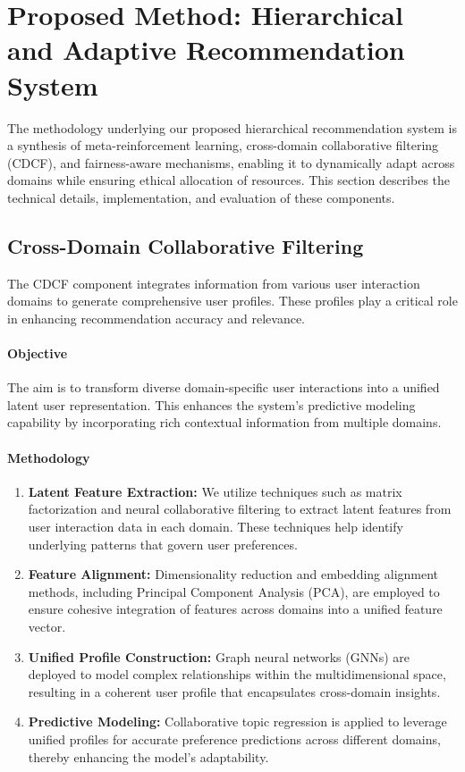 \section{Proposed Method: Hierarchical and Adaptive Recommendation System}

The methodology underlying our proposed hierarchical recommendation system is a synthesis of meta-reinforcement learning, cross-domain collaborative filtering (CDCF), and fairness-aware mechanisms, enabling it to dynamically adapt across domains while ensuring ethical allocation of resources. This section describes the technical details, implementation, and evaluation of these components.

\subsection{Cross-Domain Collaborative Filtering}

The CDCF component integrates information from various user interaction domains to generate comprehensive user profiles. These profiles play a critical role in enhancing recommendation accuracy and relevance.

\paragraph{Objective}
The aim is to transform diverse domain-specific user interactions into a unified latent user representation. This enhances the system's predictive modeling capability by incorporating rich contextual information from multiple domains.

\paragraph{Methodology}
\begin{enumerate}
    \item \textbf{Latent Feature Extraction:} We utilize techniques such as matrix factorization and neural collaborative filtering to extract latent features from user interaction data in each domain. These techniques help identify underlying patterns that govern user preferences.
  
    \item \textbf{Feature Alignment:} Dimensionality reduction and embedding alignment methods, including Principal Component Analysis (PCA), are employed to ensure cohesive integration of features across domains into a unified feature vector.

    \item \textbf{Unified Profile Construction:} Graph neural networks (GNNs) are deployed to model complex relationships within the multidimensional space, resulting in a coherent user profile that encapsulates cross-domain insights.

    \item \textbf{Predictive Modeling:} Collaborative topic regression is applied to leverage unified profiles for accurate preference predictions across different domains, thereby enhancing the model's adaptability.
\end{enumerate}

